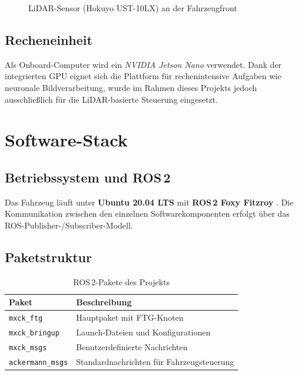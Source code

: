 \begin{figure}[H]
  \centering
  \caption{LiDAR-Sensor (Hokuyo UST-10LX) an der Fahrzeugfront}
  \label{fig:lidar_mount}
\end{figure}

\subsection{Recheneinheit}
\label{subsec:jetson}

Als Onboard-Computer wird ein \emph{NVIDIA Jetson Nano} verwendet.
Dank der integrierten GPU eignet sich die Plattform für
rechenintensive Aufgaben wie neuronale Bildverarbeitung, wurde im
Rahmen dieses Projekts jedoch ausschließlich für die LiDAR-basierte
Steuerung eingesetzt.

\section{Software-Stack}
\label{sec:software}

\subsection{Betriebssystem und ROS\,2}
\label{subsec:ros}

Das Fahrzeug läuft unter \textbf{Ubuntu 20.04 LTS} mit
\textbf{ROS\,2 Foxy Fitzroy} \cite{macenski2022ros2}.
Die Kommunikation zwischen den einzelnen Softwarekomponenten erfolgt
über das ROS-Publisher-/Subscriber-Modell.

\subsection{Paketstruktur}
\label{subsec:packages}

\begin{table}[H]
  \centering
  \caption{ROS\,2-Pakete des Projekts}
  \label{tab:ros_packages}
  \begin{tabular}{@{}ll@{}}
    \toprule
    \textbf{Paket}            & \textbf{Beschreibung} \\
    \midrule
    \texttt{mxck\_ftg}        & Hauptpaket mit FTG-Knoten \\
    \texttt{mxck\_bringup}    & Launch-Dateien und Konfigurationen \\
    \texttt{mxck\_msgs}       & Benutzerdefinierte Nachrichten \\
    \texttt{ackermann\_msgs}  & Standardnachrichten für Fahrzeugsteuerung \\
    \bottomrule
  \end{tabular}
\end{table}

